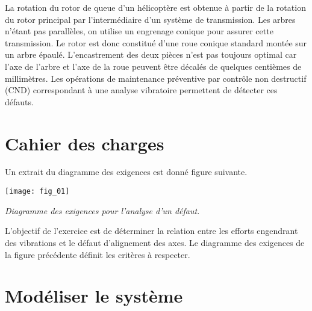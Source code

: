 \ifprof
\else
\begin{multicols}{2}



La rotation du rotor de queue d'un hélicoptère est obtenue à partir de la rotation du rotor principal par l'intermédiaire d'un système de transmission. Les arbres n'étant pas parallèles, on utilise un engrenage conique pour assurer cette transmission. Le rotor est donc constitué d'une roue conique standard montée sur un arbre épaulé. L'encastrement des deux pièces n'est pas toujours optimal car l'axe de l'arbre et l'axe de la roue peuvent être décalés de quelques centièmes de millimètres. 
Les opérations de maintenance préventive par contrôle non destructif (CND) correspondant à une analyse vibratoire permettent de détecter ces défauts.

\section*{Cahier des charges}
Un extrait du diagramme des exigences est donné figure suivante.

\begin{center}
%
\texttt{[image: fig\_01]}

\textit{Diagramme des exigences pour l'analyse d'un défaut.}
\end{center}


\begin{obj}
L'objectif de l'exercice est de déterminer la relation entre les efforts engendrant des vibrations et le défaut d'alignement des axes. Le diagramme des exigences de la figure précédente%
définit les critères à respecter.
\end{obj}

\section*{Modéliser le système\\}

%
%


\end{multicols}
